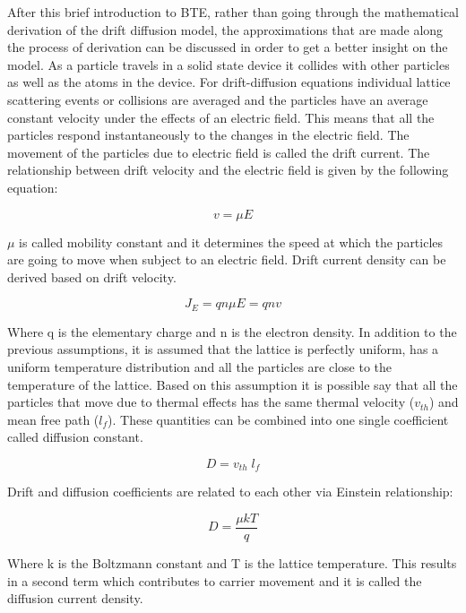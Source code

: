 \begin{doublespace}
After this brief introduction to BTE, rather than going through the mathematical derivation of the drift diffusion model, the approximations that are made along the process of derivation can be discussed in order to get a better insight on the model.  As a particle travels in a solid state device it collides with other particles as well as the atoms in the device. For drift-diffusion equations individual lattice scattering events or collisions are averaged and the particles have an average constant velocity under the effects of an electric field. This means that all the particles respond instantaneously to the changes in the electric field. The movement of the particles due to electric field is called the drift current. The relationship between drift velocity and the electric field is given by the following equation:

\begin{equation}
v=\mu E
\end{equation}

$\mu$ is called mobility constant and it determines the speed at which the particles are going to move when subject to an electric field. Drift current density can be derived based on drift velocity.

\begin{equation}
J_E=q n\mu E=q n v 
\end{equation}

Where q is the elementary charge and n is the electron density. In addition to the previous assumptions, it is assumed that the lattice is perfectly uniform, has a uniform temperature distribution and all the particles are close to the temperature of the lattice. Based on this assumption it is possible say that all the particles that move due to thermal effects has the same thermal velocity ($v_{th}$) and mean free path ($l_f$). These quantities can be combined into one single coefficient called diffusion constant. 

\begin{equation}
D=v_{th} \;l_f
\end{equation}

Drift and diffusion coefficients are related to each other via Einstein relationship:

\begin{equation}
D=\frac{\mu k T}{q}
\end{equation}

Where k is the Boltzmann constant and T is the lattice temperature. This results in a second term which contributes to carrier movement and it is called the diffusion current density.


\end{doublespace}
